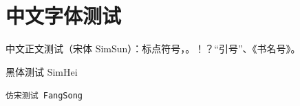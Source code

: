 \documentclass[UTF8]{ctexart}
\begin{document}
\section{中文字体测试}

中文正文测试（宋体 SimSun）：标点符号，。！？“引号”、《书名号》。

\textsf{黑体测试 SimHei}

\texttt{仿宋测试 FangSong}
\end{document}
